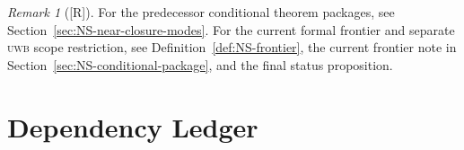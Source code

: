 \documentclass[12pt,oneside]{amsbook}
\theoremstyle{plain}
\theoremstyle{definition}
\theoremstyle{remark}
\newtheorem{remark}[theorem]{Remark}
\newcommand{\status}[1]{\textup{[#1]}}
\begin{document}
\begin{remark}[\status{R}]
For the predecessor conditional theorem packages, see
Section~\ref{sec:NS-near-closure-modes}. For the current formal
frontier and separate \textsc{uwb} scope restriction, see
Definition~\ref{def:NS-frontier}, the current frontier note in
Section~\ref{sec:NS-conditional-package}, and the final status
proposition.
\end{remark}

\section{Dependency Ledger}

\renewcommand{\arraystretch}{1.4}
\noindent
\end{document}
